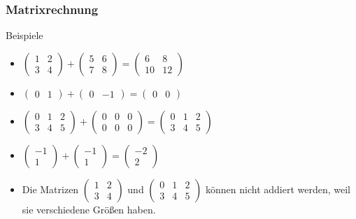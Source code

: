 \documentclass{beamer}
\renewcommand{\oe}{\"o}
\newcommand{\mytitle}{Matrixrechnung}
\begin{document}
\begin{frame}\frametitle{\mytitle}
	\begin{block}{Beispiele}
		\begin{itemize}
			\item $\displaystyle\begin{pmatrix}1&2\\3&4\end{pmatrix}+\begin{pmatrix}5&6\\7&8\end{pmatrix}=\begin{pmatrix}6&8\\10&12\end{pmatrix}$
			\item $\displaystyle\begin{pmatrix}0&1\end{pmatrix}+\begin{pmatrix}0&-1\end{pmatrix}=\begin{pmatrix}0&0\end{pmatrix}$
			\item $\displaystyle\begin{pmatrix}0&1&2\\3&4&5\end{pmatrix}+\begin{pmatrix}0&0&0\\0&0&0\end{pmatrix}=\begin{pmatrix}0&1&2\\3&4&5\end{pmatrix}$
			\item $\displaystyle\begin{pmatrix}-1\\1\end{pmatrix}+\begin{pmatrix}-1\\1\end{pmatrix}=\begin{pmatrix}-2\\2\end{pmatrix}$
			\item Die Matrizen $\begin{pmatrix}1&2\\3&4\end{pmatrix}$ und $\begin{pmatrix}0&1&2\\3&4&5\end{pmatrix}$ k\oe nnen nicht addiert werden, weil sie verschiedene Gr\oe\ss en haben.
		\end{itemize}
	\end{block}
\end{frame}
\end{document}
